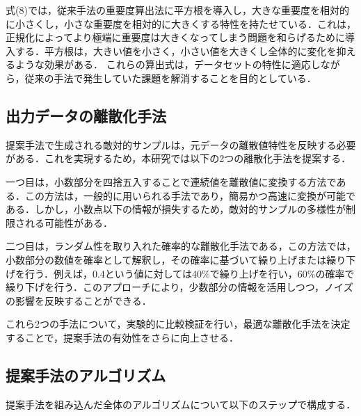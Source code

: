 式(8)では，従来手法の重要度算出法に平方根を導入し，大きな重要度を相対的に小さくし，小さな重要度を相対的に大きくする特性を持たせている．これは，正規化によってより極端に重要度は大きくなってしまう問題を和らげるために導入する．平方根は，大きい値を小さく，小さい値を大きくし全体的に変化を抑えるような効果がある．
これらの算出式は，データセットの特性に適応しながら，従来の手法で発生していた課題を解消することを目的としている．

\subsection{出力データの離散化手法}
提案手法で生成される敵対的サンプルは，元データの離散値特性を反映する必要がある．これを実現するため，本研究では以下の2つの離散化手法を提案する．

一つ目は，小数部分を四捨五入することで連続値を離散値に変換する方法である．この方法は，一般的に用いられる手法であり，簡易かつ高速に変換が可能である．しかし，小数点以下の情報が損失するため，敵対的サンプルの多様性が制限される可能性がある．

二つ目は，ランダム性を取り入れた確率的な離散化手法である，この方法では，小数部分の数値を確率として解釈し，その確率に基づいて繰り上げまたは繰り下げを行う．例えば，0.4という値に対しては40\%で繰り上げを行い，60\%の確率で繰り下げを行う．このアプローチにより，少数部分の情報を活用しつつ，ノイズの影響を反映することができる．

これら2つの手法について，実験的に比較検証を行い，最適な離散化手法を決定することで，提案手法の有効性をさらに向上させる．

\subsection{提案手法のアルゴリズム}
提案手法を組み込んだ全体のアルゴリズムについて以下のステップで構成する．


